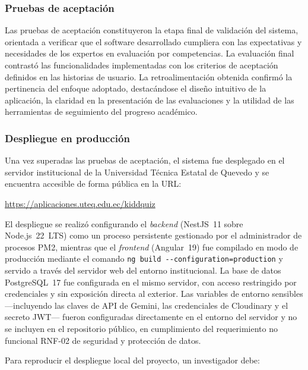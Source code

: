 \subsubsection{Pruebas de aceptación}

Las pruebas de aceptación constituyeron la etapa final de validación del sistema, orientada a verificar que el software desarrollado cumpliera con las expectativas y necesidades de los expertos en evaluación por competencias. La evaluación final contrastó las funcionalidades implementadas con los criterios de aceptación definidos en las historias de usuario. La retroalimentación obtenida confirmó la pertinencia del enfoque adoptado, destacándose el diseño intuitivo de la aplicación, la claridad en la presentación de las evaluaciones y la utilidad de las herramientas de seguimiento del progreso académico.

\subsubsection*{Despliegue en producción}

Una vez superadas las pruebas de aceptación, el sistema fue desplegado en el
servidor institucional de la Universidad Técnica Estatal de Quevedo y se encuentra
accesible de forma pública en la URL:
\begin{center}
  \url{https://aplicaciones.uteq.edu.ec/kiddquiz}
\end{center}

El despliegue se realizó configurando el \textit{backend} (NestJS~11 sobre Node.js~22~LTS)
como un proceso persistente gestionado por el administrador de procesos PM2, mientras
que el \textit{frontend} (Angular~19) fue compilado en modo de producción mediante el
comando \texttt{ng build -{}-configuration=production} y servido a través del servidor
web del entorno institucional. La base de datos PostgreSQL~17 fue configurada en el
mismo servidor, con acceso restringido por credenciales y sin exposición directa
al exterior. Las variables de entorno sensibles ---incluyendo las claves de API de
Gemini, las credenciales de Cloudinary y el secreto JWT--- fueron configuradas
directamente en el entorno del servidor y no se incluyen en el repositorio público,
en cumplimiento del requerimiento no funcional RNF-02 de seguridad y protección de datos.

Para reproducir el despliegue local del proyecto, un investigador debe:

